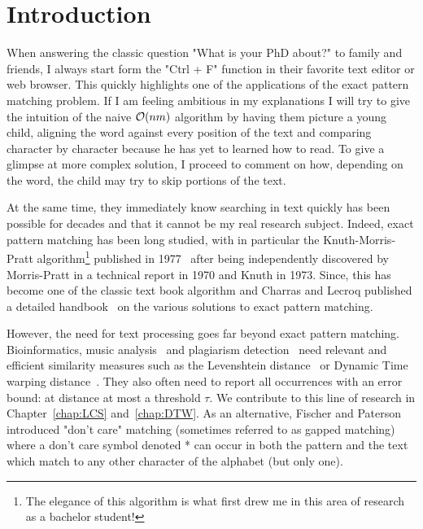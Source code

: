 \chapter*{Introduction}\label{chap:intro}

When answering the classic question "What is your PhD about?" to family and friends, I always start form the "Ctrl + F" function in their favorite text editor or web browser. This quickly highlights one of the applications of the exact pattern matching problem. If I am feeling ambitious in my explanations I will try to give the intuition of the naive $\mathcal{O}(nm)$ algorithm by having them picture a young child, aligning the word against every position of the text and comparing character by character because he has yet to learned how to read. To give a glimpse at more complex solution, I proceed to comment on how, depending on the word, the child may try to skip portions of the text.

At the same time, they immediately know searching in text quickly has been possible for decades and that it cannot be my real research subject. Indeed, exact pattern matching has been long studied, with in particular the Knuth-Morris-Pratt algorithm\footnote{The elegance of this algorithm is what first drew me in this area of research as a bachelor student!} published in 1977~\cite{KMP} after being independently discovered by Morris-Pratt in a technical report in 1970 and Knuth in 1973. Since, this has become one of the classic text book algorithm and Charras and Lecroq published a detailed handbook~\cite{charras2004handbook} on the various solutions to exact pattern matching.


However, the need for text processing goes far beyond exact pattern matching.
Bioinformatics\cite{Gusfield1997}, music analysis~\cite{mongeau1990comparison} and plagiarism detection~\cite{lukashenko2007computer} need relevant and efficient similarity measures such as the Levenshtein distance~\cite{levenshtein1966binary} or Dynamic Time warping distance~\cite{sakoe1978dynamic}. They also often need to report all occurrences with an error bound\cite{landau1986efficient,landau1989fast}: at distance at most a threshold $\tau$.
We contribute to this line of research in Chapter~\ref{chap:LCS} and~\ref{chap:DTW}.
As an alternative, Fischer and Paterson~\cite{fischer1974string} introduced "don't care" matching (sometimes referred to as gapped matching) where a don't care symbol denoted * can occur in both the pattern and the text which match to any other character of the alphabet (but only one). 

